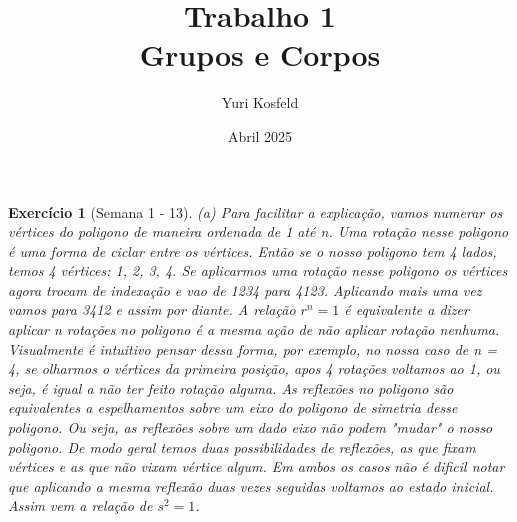 \documentclass{article}
\title{Trabalho 1 \\ \large Grupos e Corpos}
\author{Yuri Kosfeld}
\date{Abril 2025}
\newtheorem*{ex}{Exercício}
\begin{document}
\maketitle

\begin{ex}[Semana 1 - 13]
    (a) Para facilitar a explicação, vamos numerar os vértices do poligono de maneira ordenada de 1 até n.
    Uma rotação nesse poligono é uma forma de ciclar entre os vértices. Então se o nosso poligono
    tem 4 lados, temos 4 vértices: 1, 2, 3, 4. Se aplicarmos uma rotação nesse poligono os vértices
    agora trocam de indexação e vao de 1234 para 4123. Aplicando mais uma vez vamos para 3412 e assim por diante.
    A relação $r^n = 1$ é equivalente a dizer aplicar n rotações no poligono é a mesma ação de não aplicar rotação nenhuma.
    Visualmente é intuitivo pensar dessa forma, por exemplo, no nossa caso de n = 4, se olharmos
    o vértices da primeira posição, apos 4 rotações voltamos ao 1, ou seja, é igual a não ter feito
    rotação alguma. As reflexões no poligono são equivalentes a espelhamentos sobre um eixo do poligono de simetria desse poligono.
    Ou seja, as reflexões sobre um dado eixo não podem "mudar" o nosso poligono. De modo geral temos duas 
    possibilidades de reflexões, as que fixam vértices e as que não vixam vértice algum.
    Em ambos os casos não é dificil notar que aplicando a mesma reflexão duas vezes seguidas
    voltamos ao estado inicial. Assim vem a relação de $s^2=1$.
    \begin{center}
        \begin{tikzpicture}[x=0.75pt,y=0.75pt,yscale=-1,xscale=1]


\end{tikzpicture}
\end{center}
\end{ex}
\end{document}
